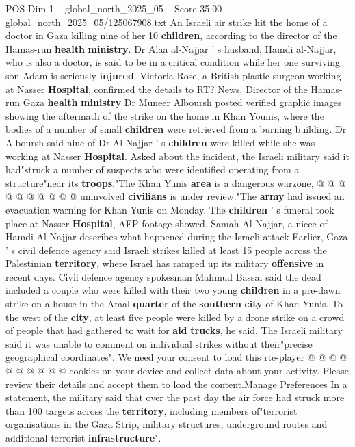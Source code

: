\begin{textsample}{POS Dim 1 – global\_north\_2025\_05 – Score 35.00 – global\_north\_2025\_05/125067908.txt}  \label{ex:f1_pos_219}
An Israeli air strike hit the home of a doctor in Gaza killing nine of her 10 \textbf{children}, according to the director of the Hamas-run \textbf{health} \textbf{ministry}.
Dr Alaa al-Najjar ' s husband, Hamdi al-Najjar, who is also a doctor, is said to be in a critical condition while her one surviving son Adam is seriously \textbf{injured}.
Victoria Rose, a British plastic surgeon working at Nasser \textbf{Hospital}, confirmed the details to RT?
News.
Director of the Hamas-run Gaza \textbf{health} \textbf{ministry} Dr Muneer Alboursh posted verified graphic images showing the aftermath of the strike on the home in Khan Younis, where the bodies of a number of small \textbf{children} were retrieved from a burning building.
Dr Alboursh said nine of Dr Al-Najjar ' s \textbf{children} were killed while she was working at Nasser \textbf{Hospital}.
Asked about the incident, the Israeli military said it had"struck a number of suspects who were identified operating from a structure"near its \textbf{troops}."The Khan Yunis \textbf{area} is a dangerous warzone, @ @ @ @ @ @ @ @ @ @ uninvolved \textbf{civilians} is under review."The \textbf{army} had issued an evacuation warning for Khan Yunis on Monday.
The \textbf{children} ' s funeral took place at Nasser \textbf{Hospital}, AFP footage showed.
Samah Al-Najjar, a niece of Hamdi Al-Najjar describes what happened during the Israeli attack Earlier, Gaza ' s civil defence agency said Israeli strikes killed at least 15 people across the Palestinian \textbf{territory}, where Israel has ramped up its military \textbf{offensive} in recent days.
Civil defence agency spokesman Mahmud Bassal said the dead included a couple who were killed with their two young \textbf{children} in a pre-dawn strike on a house in the Amal \textbf{quarter} of the \textbf{southern} \textbf{city} of Khan Yunis.
To the west of the \textbf{city}, at least five people were killed by a drone strike on a crowd of people that had gathered to wait for \textbf{aid} \textbf{trucks}, he said.
The Israeli military said it was unable to comment on individual strikes without their"precise geographical coordinates".
We need your consent to load this rte-player @ @ @ @ @ @ @ @ @ @ cookies on your device and collect data about your activity.
Please review their details and accept them to load the content.Manage Preferences In a statement, the military said that over the past day the air force had struck more than 100 targets across the \textbf{territory}, including members of"terrorist organisations in the Gaza Strip, military structures, underground routes and additional terrorist \textbf{infrastructure}".

\end{textsample}
